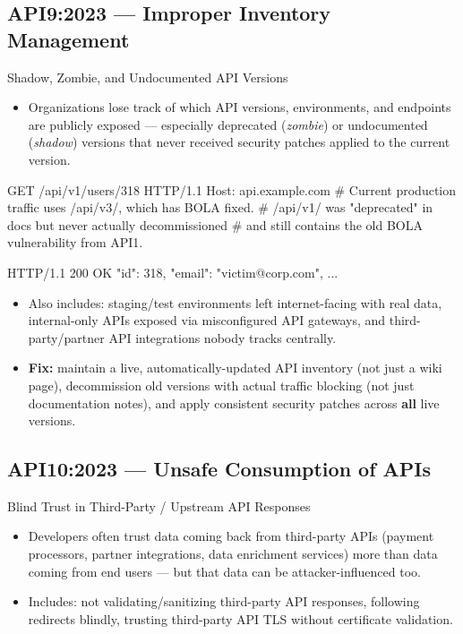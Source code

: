 \documentclass[11pt]{article}
\begin{document}
\subsection{API9:2023 --- Improper Inventory Management}
\begin{vulnbox}{Shadow, Zombie, and Undocumented API Versions}
\begin{itemize}
  \item Organizations lose track of which API versions, environments, and endpoints are publicly exposed --- especially deprecated (\textit{zombie}) or undocumented (\textit{shadow}) versions that never received security patches applied to the current version.
\end{itemize}
\end{vulnbox}

\begin{httpbox}
GET /api/v1/users/318 HTTP/1.1
Host: api.example.com
# Current production traffic uses /api/v3/, which has BOLA fixed.
# /api/v1/ was "deprecated" in docs but never actually decommissioned
# and still contains the old BOLA vulnerability from API1.

HTTP/1.1 200 OK
{ "id": 318, "email": "victim@corp.com", ... }
\end{httpbox}

\begin{itemize}
  \item Also includes: staging/test environments left internet-facing with real data, internal-only APIs exposed via misconfigured API gateways, and third-party/partner API integrations nobody tracks centrally.
  \item \textbf{Fix:} maintain a live, automatically-updated API inventory (not just a wiki page), decommission old versions with actual traffic blocking (not just documentation notes), and apply consistent security patches across \textbf{all} live versions.
\end{itemize}

\subsection{API10:2023 --- Unsafe Consumption of APIs}
\begin{vulnbox}{Blind Trust in Third-Party / Upstream API Responses}
\begin{itemize}
  \item Developers often trust data coming back from third-party APIs (payment processors, partner integrations, data enrichment services) more than data coming from end users --- but that data can be attacker-influenced too.
  \item Includes: not validating/sanitizing third-party API responses, following redirects blindly, trusting third-party API TLS without certificate validation.
\end{itemize}
\end{vulnbox}
\end{document}
